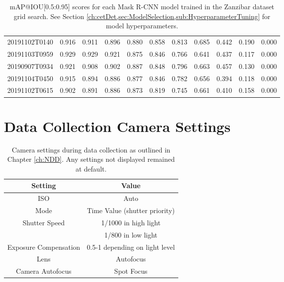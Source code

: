 \begin{table}[!ht]
{\begin{tabular}{ccccccccccc}
			20191102T0140 &          0.916 &          0.911 &          0.896 &          0.880 &          0.858 &          0.813 &          0.685 &          0.442 &          0.190 &          0.000 \\
			20191103T0959 &          0.929 &          0.929 &          0.921 &          0.875 &          0.846 &          0.766 &          0.641 &          0.437 &          0.117 &          0.000 \\
			20190907T0934 &          0.921 &          0.908 &          0.902 &          0.887 &          0.848 &          0.796 &          0.663 &          0.457 &          0.130 &          0.000 \\
			20191104T0450 &          0.915 &          0.894 &          0.886 &          0.877 &          0.846 &          0.782 &          0.656 &          0.394 &          0.118 &          0.000 \\
			20191102T0615 &          0.902 &          0.891 &          0.886 &          0.873 &          0.819 &          0.745 &          0.661 &          0.410 &          0.158 &          0.000 \\
			\bottomrule
		\end{tabular}}
	\caption{mAP@IOU[0.5:0.95] scores for each Mask R-CNN model trained in the Zanzibar dataset grid search. See Section \ref{ch:cetDet,sec:ModelSelection,sub:HyperparameterTuning} for model hyperparameters.}
\end{table}

\newpage
\section{Data Collection Camera Settings}\label{app:DataCollectionCameraSettings}

\begin{table}[!ht]
	\centering
	\begin{tabular}{cc}\toprule
		\textbf{Setting}               & \textbf{Value}                 \\\midrule
		ISO                            & Auto                           \\
		Mode                           & Time Value (shutter priority)  \\
		\multirow{2}{*}{Shutter Speed} & 1/1000 in high light           \\
		& 1/800 in low light             \\
		Exposure Compensation          & 0.5-1 depending on light level \\
		Lens                          & Autofocus                      \\
		Camera Autofocus               & Spot Focus               \\\bottomrule     
	\end{tabular}
	\caption{Camera settings during data collection as outlined in Chapter \ref{ch:NDD}. Any settings not displayed remained at default.}
\end{table}

